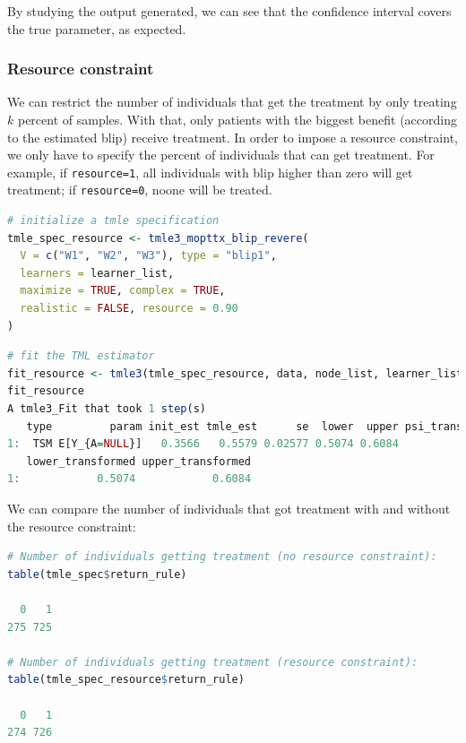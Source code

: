 \documentclass[
  12pt, krantz2,
]{krantz}
\newcommand{\passthrough}[1]{#1}
\newcommand{\1}{\mathbbm{1}}
\theoremstyle{definition}
\theoremstyle{definition}
\theoremstyle{definition}
\theoremstyle{definition}
\theoremstyle{remark}
\begin{document}
By studying the output generated, we can see that the confidence interval covers the
true parameter, as expected.

\hypertarget{resource-constraint}{%
\subsubsection{Resource constraint}\label{resource-constraint}}

We can restrict the number of individuals that get the treatment by only
treating \(k\) percent of samples. With that, only patients with the biggest benefit (according
to the estimated blip) receive treatment. In order to impose a
resource constraint, we only have to specify the percent of individuals that can
get treatment. For example, if \passthrough{\lstinline!resource=1!}, all
individuals with blip higher than zero will get treatment; if \passthrough{\lstinline!resource=0!},
noone will be treated.

\begin{lstlisting}[language=R]
# initialize a tmle specification
tmle_spec_resource <- tmle3_mopttx_blip_revere(
  V = c("W1", "W2", "W3"), type = "blip1",
  learners = learner_list,
  maximize = TRUE, complex = TRUE,
  realistic = FALSE, resource = 0.90
)
\end{lstlisting}

\begin{lstlisting}[language=R]
# fit the TML estimator
fit_resource <- tmle3(tmle_spec_resource, data, node_list, learner_list)
fit_resource
A tmle3_Fit that took 1 step(s)
   type         param init_est tmle_est      se  lower  upper psi_transformed
1:  TSM E[Y_{A=NULL}]   0.3566   0.5579 0.02577 0.5074 0.6084          0.5579
   lower_transformed upper_transformed
1:            0.5074            0.6084
\end{lstlisting}

We can compare the number of individuals that got treatment with and without the
resource constraint:

\begin{lstlisting}[language=R]
# Number of individuals getting treatment (no resource constraint):
table(tmle_spec$return_rule)

  0   1 
275 725 

# Number of individuals getting treatment (resource constraint):
table(tmle_spec_resource$return_rule)

  0   1 
274 726 
\end{lstlisting}
\end{document}
